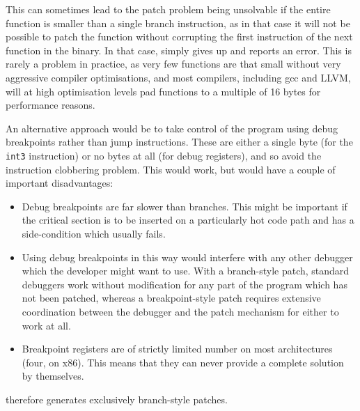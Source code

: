 This can sometimes lead to the patch problem being unsolvable if the
entire function is smaller than a single branch instruction, as in
that case it will not be possible to patch the function without
corrupting the first instruction of the next function in the binary.
In that case, {\implementation} simply gives up and reports an error.
This is rarely a problem in practice, as very few functions are that
small without very aggressive compiler optimisations, and most
compilers, including gcc\cite[Section~3.10]{Stallman2010} and
LLVM\needCite{}, will at high optimisation levels pad functions to a
multiple of 16 bytes for performance reasons.

An alternative approach would be to take control of the program using
debug breakpoints rather than jump instructions.  These are either a
single byte (for the \verb|int3| instruction) or no bytes at all (for
debug registers), and so avoid the instruction clobbering problem.
This would work, but would have a couple of important disadvantages:

\begin{itemize}
\item
  Debug breakpoints are far slower than branches.  This might be
  important if the critical section is to be inserted on a
  particularly hot code path and has a side-condition which usually
  fails.
\item
  Using debug breakpoints in this way would interfere with any other
  debugger which the developer might want to use.  With a branch-style
  patch, standard debuggers work without modification for any part of
  the program which has not been patched, whereas a breakpoint-style
  patch requires extensive coordination between the debugger and the
  patch mechanism for either to work at all.
\item
  Breakpoint registers are of strictly limited number on most
  architectures (four, on x86).  This means that they can never
  provide a complete solution by themselves.
\end{itemize}

{\Implementation} therefore generates exclusively branch-style patches.

